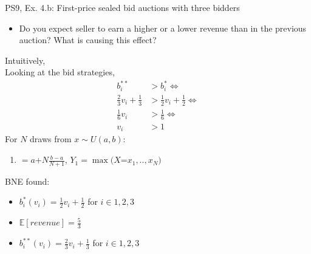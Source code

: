 \begin{frame}{PS9, Ex. 4.b: First-price sealed bid auctions with three bidders}
    \begin{itemize}
      \item[(b)] Do you expect seller to earn a higher or a lower revenue than in the previous auction? What is causing this effect?
    \end{itemize}
    \vspace{-8pt}
    \begin{multicols}{2}
    Intuitively, \\\medskip
    Looking at the bid strategies, 
    \begin{align*}
      b_i^{**}&>b_i^{*}\Leftrightarrow\\
      \frac{2}{3}v_i+\frac{1}{3}&>\frac{1}{2}v_i+\frac{1}{2}\Leftrightarrow\\
      \frac{1}{6}v_i&>\frac{1}{6}\Leftrightarrow\\
                 v_i&>1
    \end{align*}
    \vfill\null\columnbreak
    For $N$ draws from $x\sim U(a, b):$
    \vspace{-6pt}
    \begin{enumerate}
      \item[$\mathbb{E}(Y_1)$] $=a$+$N\frac{b-a}{N+1}$, $Y_1=\max(X$=$x_1,..,x_N)$
    \end{enumerate}
    \vspace{-6pt}
    BNE found:
    \begin{itemize}
      \item[(3.a)] $b_i^{*}(v_i)=\frac{1}{2}v_i+\frac{1}{2}$ for $i\in1,2,3$
      \item[(3.b)] $\mathbb{E}[revenue]=\frac{5}{3}$
      \item[(4.a)] $b_i^{**}(v_i)=\frac{2}{3}v_i+\frac{1}{3}$ for $i\in1,2,3$
    \end{itemize}
    \vfill\null
    \end{multicols}
\end{frame}
